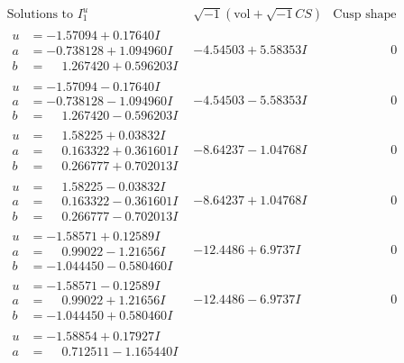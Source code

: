 \documentclass[1p]{elsarticle_modified}
\theoremstyle{definition}
\newcommand{\I}{\sqrt{-1}}
\begin{document}
$$\begin{array}{c|c|c}
\text{Solutions to }I^u_{1}& \I (\text{vol} + \sqrt{-1}CS) & \text{Cusp shape}\\
 \hline 
\begin{aligned}
u &= -1.57094 + 0.17640 I \\
a &= -0.738128 + 1.094960 I \\
b &= \phantom{-}1.267420 + 0.596203 I\end{aligned}
 & -4.54503 + 5.58353 I & \phantom{-0.000000 } 0 \\ \hline\begin{aligned}
u &= -1.57094 - 0.17640 I \\
a &= -0.738128 - 1.094960 I \\
b &= \phantom{-}1.267420 - 0.596203 I\end{aligned}
 & -4.54503 - 5.58353 I & \phantom{-0.000000 } 0 \\ \hline\begin{aligned}
u &= \phantom{-}1.58225 + 0.03832 I \\
a &= \phantom{-}0.163322 + 0.361601 I \\
b &= \phantom{-}0.266777 + 0.702013 I\end{aligned}
 & -8.64237 - 1.04768 I & \phantom{-0.000000 } 0 \\ \hline\begin{aligned}
u &= \phantom{-}1.58225 - 0.03832 I \\
a &= \phantom{-}0.163322 - 0.361601 I \\
b &= \phantom{-}0.266777 - 0.702013 I\end{aligned}
 & -8.64237 + 1.04768 I & \phantom{-0.000000 } 0 \\ \hline\begin{aligned}
u &= -1.58571 + 0.12589 I \\
a &= \phantom{-}0.99022 - 1.21656 I \\
b &= -1.044450 - 0.580460 I\end{aligned}
 & -12.4486 + 6.9737 I & \phantom{-0.000000 } 0 \\ \hline\begin{aligned}
u &= -1.58571 - 0.12589 I \\
a &= \phantom{-}0.99022 + 1.21656 I \\
b &= -1.044450 + 0.580460 I\end{aligned}
 & -12.4486 - 6.9737 I & \phantom{-0.000000 } 0 \\ \hline\begin{aligned}
u &= -1.58854 + 0.17927 I \\
a &= \phantom{-}0.712511 - 1.165440 I \\

\end{aligned}
\end{array}$$
\end{document}
